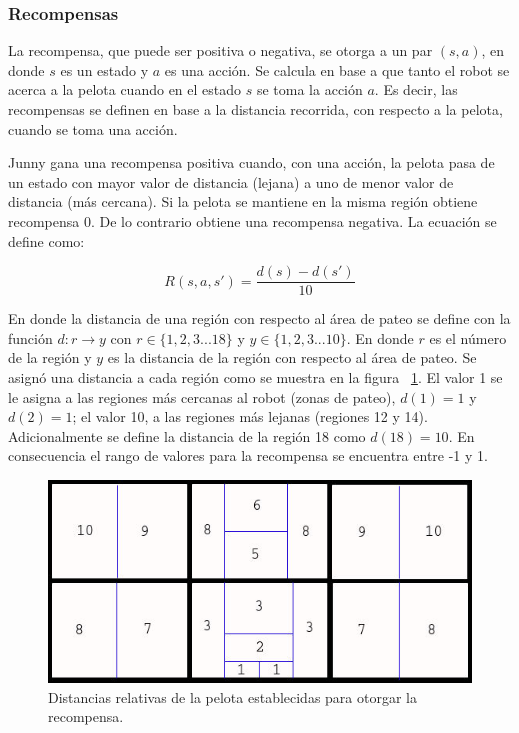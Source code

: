 \subsubsection{Recompensas}\label{recompensas}

La recompensa, que puede ser positiva o negativa, se otorga a un par $(s,a)$, en donde $s$ es un estado y $a$ es una acci\'on. Se calcula en base a que tanto el robot se acerca a la pelota cuando en el estado $s$ se toma la acci\'on $a$. Es decir, las recompensas se definen en base a la distancia recorrida, con respecto a la pelota, cuando se toma una acci\'on.  

Junny gana una recompensa positiva cuando, con una acción, la pelota pasa de un estado con mayor valor de distancia (lejana) a uno de menor valor de distancia (más cercana). Si la pelota se mantiene en la misma región obtiene recompensa 0. De lo contrario obtiene una recompensa negativa. La ecuación se define como:

\begin{equation}
R(s,a,s') = \dfrac{d(s) - d(s')}{10}
\end{equation}

En donde la distancia de una región con respecto al área de pateo se define con la función $d: r \rightarrow y$ con $r \in \{1,2,3 ...18\}$ y $y \in \{1,2,3 ...10\}$. En donde $r$ es el número de la región y $y$ es la distancia de la región con respecto al \'area de pateo. Se asign\'o una distancia a cada regi\'on como se muestra en la figura ~\ref{fig:distancias}. El valor 1 se le asigna a las regiones m\'as cercanas al robot (zonas de pateo), $d(1)= 1$ y $d(2)=1$; el valor 10, a las regiones m\'as lejanas (regiones 12 y 14). Adicionalmente se define la distancia de la región 18 como $d(18)=10$. En consecuencia el rango de valores para la recompensa se encuentra entre -1 y 1. 
     
\begin{figure}[hbtp]
\centering
\includegraphics[scale=0.5]{imagenes/Distancias2.jpg}
\caption{Distancias relativas de la pelota establecidas para otorgar la recompensa.}
\label{fig:distancias}
\end{figure}

